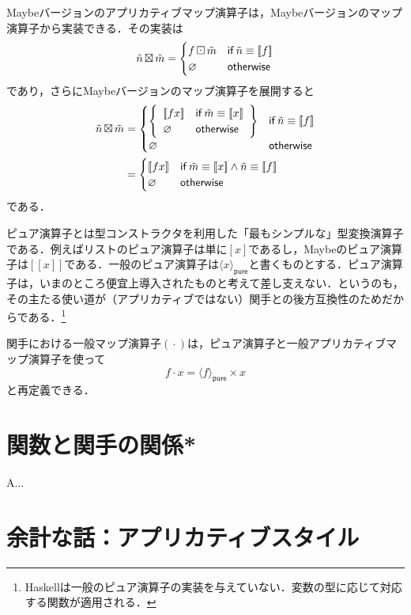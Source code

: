 \documentclass[twocolumn]{jsbook}
\def\[{\left[\!\left[}
\def\]{\right]\!\right]}
\newcommand{\programminglanguage}[1]{\textsf{#1}}
\newcommand{\haskell}{\programminglanguage{Haskell}}
\DeclareMathOperator{\hsklApplicativeMap}{\times}
\DeclareMathOperator{\hsklApplicativeMaybeMap}{\boxtimes}
\DeclareMathOperator{\hsklFmap}{\cdot}
\DeclareMathOperator{\hsklMaybeMap}{\boxdot}
\newcommand{\hsklNothing}{\varnothing}
\newcommand{\hsklJust}[1]{\[#1\]}
\newcommand{\hsklPure}[1]{\langle#1\rangle_\textsf{pure}}
\newcommand{\hsklMaybe}[1]{\Tilde{#1}}
\newcommand{\mathKeyword}[1]{\mathsf{#1}}
\DeclareMathOperator{\mathIf}{\mathKeyword{if}}
\newcommand{\mathOtherwise}{\mathKeyword{otherwise}}
\begin{document}
Maybeバージョンのアプリカティブマップ演算子は，Maybeバージョンのマップ演算子から実装できる．その実装は
\begin{equation*}
\hsklMaybe{n}\hsklApplicativeMaybeMap\hsklMaybe{m}=\begin{cases}
f\hsklMaybeMap\hsklMaybe{m}&\mathIf\hsklMaybe{n}\equiv\hsklJust{f}\\
\hsklNothing&\mathOtherwise
\end{cases}
\end{equation*}
であり，さらにMaybeバージョンのマップ演算子を展開すると
\begin{align*}
\hsklMaybe{n}\hsklApplicativeMaybeMap\hsklMaybe{m}&=\begin{cases}
\left\{
\begin{array}{ll}
\hsklJust{fx}&\mathIf\hsklMaybe{m}\equiv\hsklJust{x}\\
\hsklNothing&\mathOtherwise
\end{array}\right\}&\mathIf\hsklMaybe{n}\equiv\hsklJust{f}\\
\hsklNothing&\mathOtherwise
\end{cases}\\
&=\begin{cases}
\hsklJust{fx}&\mathIf\hsklMaybe{m}\equiv\hsklJust{x}\wedge\hsklMaybe{n}\equiv\hsklJust{f}\\
\hsklNothing&\mathOtherwise
\end{cases}
\end{align*}
である．

ピュア演算子とは型コンストラクタを利用した「最もシンプルな」型変換演算子である．例えばリストのピュア演算子は単に$[x]$であるし，Maybeのピュア演算子は$\hsklJust{x}$である．一般のピュア演算子は$\hsklPure{x}$と書くものとする．ピュア演算子は，いまのところ便宜上導入されたものと考えて差し支えない．というのも，その主たる使い道が（アプリカティブではない）関手との後方互換性のためだからである．\footnote{\haskell は一般のピュア演算子の実装を与えていない．変数の型に応じて対応する関数が適用される．}

関手における一般マップ演算子$(\hsklFmap)$は，ピュア演算子と一般アプリカティブマップ演算子を使って$$f\hsklFmap x=\hsklPure{f}\hsklApplicativeMap x$$と再定義できる．

\section{関数と関手の関係*}

A...

\section{余計な話：アプリカティブスタイル}
\end{document}
